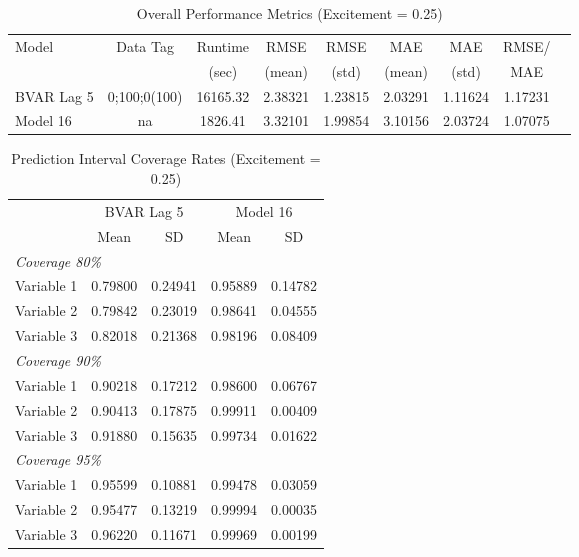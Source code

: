 
\begin{table}[htbp]
\centering
\caption{Overall Performance Metrics (Excitement = 0.25)}
\label{tab:overall_0p25}
\begin{tabular}{lcccccccc}
\toprule
Model & Data Tag & Runtime & RMSE & RMSE & MAE & MAE & RMSE/ \\
      &          & (sec)   & (mean) & (std) & (mean) & (std) & MAE \\
\midrule
BVAR Lag 5 & 0;100;0(100) & 16165.32 & 2.38321 & 1.23815 & 2.03291 & 1.11624 & 1.17231 \\
Model 16 & na & 1826.41 & 3.32101 & 1.99854 & 3.10156 & 2.03724 & 1.07075 \\
\bottomrule
\end{tabular}
\end{table}

\begin{table}[htbp]
\centering
\caption{Prediction Interval Coverage Rates (Excitement = 0.25)}
\label{tab:coverage_0p25}
\begin{tabular}{lcccc}
\toprule
 & \multicolumn{2}{c}{BVAR Lag 5} & \multicolumn{2}{c}{Model 16} \\
\cmidrule(lr){2-3} \cmidrule(lr){4-5}
 & Mean & SD & Mean & SD \\
\midrule
\multicolumn{5}{l}{\textit{Coverage 80\%}} \\
Variable 1 & 0.79800 & 0.24941 & 0.95889 & 0.14782 \\
Variable 2 & 0.79842 & 0.23019 & 0.98641 & 0.04555 \\
Variable 3 & 0.82018 & 0.21368 & 0.98196 & 0.08409 \\
\multicolumn{5}{l}{\textit{Coverage 90\%}} \\
Variable 1 & 0.90218 & 0.17212 & 0.98600 & 0.06767 \\
Variable 2 & 0.90413 & 0.17875 & 0.99911 & 0.00409 \\
Variable 3 & 0.91880 & 0.15635 & 0.99734 & 0.01622 \\
\multicolumn{5}{l}{\textit{Coverage 95\%}} \\
Variable 1 & 0.95599 & 0.10881 & 0.99478 & 0.03059 \\
Variable 2 & 0.95477 & 0.13219 & 0.99994 & 0.00035 \\
Variable 3 & 0.96220 & 0.11671 & 0.99969 & 0.00199 \\
\bottomrule
\end{tabular}
\end{table}

